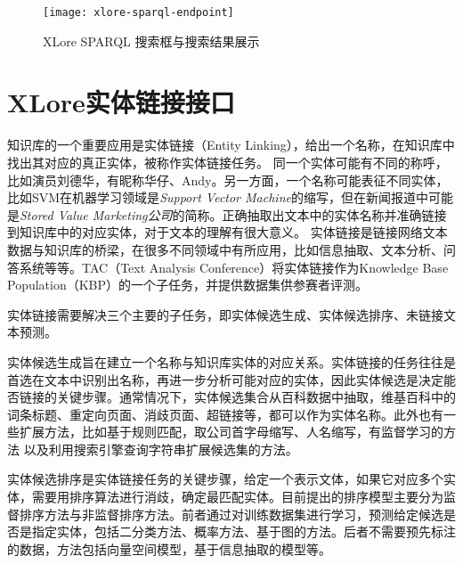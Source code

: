 \begin{figure}[ht]
  \centering
  \texttt{[image: xlore-sparql-endpoint]}
  \caption{XLore SPARQL 搜索框与搜索结果展示}
  \label{fig:xlore-sparql-endpoint}
\end{figure}

\section{XLore实体链接接口}
\label{sec5:entity-linking-api}

知识库的一个重要应用是实体链接（Entity Linking），给出一个名称，在知识库中找出其对应的真正实体，被称作{\heiti 实体链接}任务。
同一个实体可能有不同的称呼，比如演员刘德华，有昵称华仔、Andy。另一方面，一个名称可能表征不同实体，比如SVM在机器学习领域是\textit{Support Vector Machine}的缩写，但在新闻报道中可能是\textit{Stored Value Marketing公司}的简称。正确抽取出文本中的实体名称并准确链接到知识库中的对应实体，对于文本的理解有很大意义。
实体链接是链接网络文本数据与知识库的桥梁，在很多不同领域中有所应用，比如信息抽取\cite{lin2012entity,nakashole2012patty}、文本分析\cite{gattani2013entity}、问答系统\cite{gattani2013entity}等等。TAC（Text Analysis Conference）将实体链接作为Knowledge Base Population（KBP）的一个子任务，并提供数据集供参赛者评测。

实体链接需要解决三个主要的子任务，即实体候选生成、实体候选排序、未链接文本预测。

{\heiti 实体候选生成}旨在建立一个名称与知识库实体的对应关系。实体链接的任务往往是首选在文本中识别出名称，再进一步分析可能对应的实体，因此实体候选是决定能否链接的关键步骤。通常情况下，实体候选集合从百科数据中抽取\cite{shen2012linden,shen2013linking}，维基百科中的词条标题、重定向页面、消歧页面、超链接等，都可以作为实体名称。此外也有一些扩展方法，比如基于规则匹配\cite{han2009nlpr_kbp,lehmann2010lcc}，取公司首字母缩写、人名缩写，有监督学习的方法\cite{zhang2011entity} 以及利用搜索引擎查询字符串扩展候选集的方法\cite{dredze2010entity, monahan2011cross}。

{\heiti 实体候选排序}是实体链接任务的关键步骤，给定一个表示文体，如果它对应多个实体，需要用排序算法进行消歧，确定最匹配实体。目前提出的排序模型主要分为监督排序方法与非监督排序方法。前者通过对训练数据集进行学习，预测给定候选是否是指定实体，包括二分类方法\cite{lehmann2010lcc,monahan2011cross,chen2011collaborative}、概率方法\cite{han2011generative}、基于图的方法\cite{han2011collective}。后者不需要预先标注的数据，方法包括向量空间模型\cite{han2009nlpr_kbp}，基于信息抽取的模型\cite{varma2009iiit,gottipati2011linking}等。

